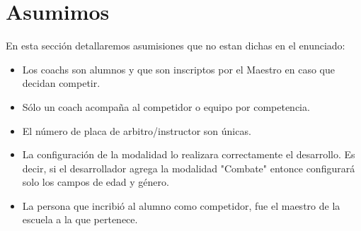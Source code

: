 \section{Asumimos}

En esta secci\'on detallaremos asumisiones que no estan dichas en el enunciado:

\begin{itemize}

\item Los coachs son alumnos y que son inscriptos por el Maestro en caso que decidan competir.
\item S\'olo un coach acompaña al competidor o equipo por competencia.
\item El n\'umero de placa de arbitro/instructor son \'unicas.
\item La configuraci\'on de la modalidad lo realizara correctamente el desarrollo. Es decir, si el desarrollador agrega la modalidad "Combate" entonce configurar\'a solo los campos de edad y g\'enero. 
\item La persona que incribió al alumno como competidor, fue el maestro de la escuela a la que pertenece.

\end{itemize}


